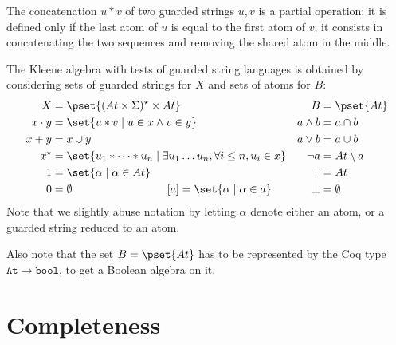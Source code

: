 \documentclass[a4paper]{llncs}
\newif\iflong\longfalse
\begin{document}
The concatenation $u\ast v$ of two guarded strings $u,v$ is a partial
operation: it is defined only if the last atom of $u$ is equal to the
first atom of $v$; it consists in concatenating the two sequences and
removing the shared atom in the middle.
\iflong
This (partial) operation is easily shown to be associative.
\fi

The Kleene algebra with tests of guarded string languages is obtained
by considering sets of guarded strings for $X$ and sets of atoms for $B$:
\begin{align*}
\begin{aligned}
    X &= \pset{(At\times\Sigma)^\star\times At}\\
    x\cdot y &= \set{u\ast v \mid u\in x \land v\in y}\\
    x+y &= x\cup y\\
    x^\star &= 
    \set{u_1\ast \dots \ast u_n \mid \exists u_1\dots u_n, \forall i\leq n, u_i\in x}\\
    1 &= \set{\alpha\mid \alpha\in At}\\
    0 &= \emptyset \hspace{3cm} [a] = \set{\alpha\mid \alpha\in a}
  \end{aligned}
  &&
  \begin{aligned}
    B &= \pset{At}\\
    a\land b &= a\cap b\\
    a\lor b &= a\cup b\\
    \neg a &= At\setminus a\\
    \top &= At\\
    \bot &= \emptyset
  \end{aligned}
\end{align*}
Note that we slightly abuse notation by letting $\alpha$ denote
either an atom, or a guarded string reduced to an atom.
\iflong
These sets and operations are shown to form a Kleene algebra with
tests.  
\fi
Also note that the set $B=\pset{At}$ has to be represented by the Coq
type $\mathtt{At\to bool}$, to get a Boolean algebra on it.



\section{Completeness}
\label{sec:completeness}
\end{document}
